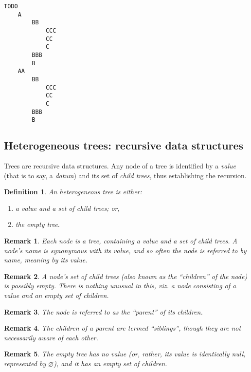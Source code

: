 \documentclass[10pt]{amsart}
\numberwithin{equation}{section}
\newtheorem{defn}{Definition}[section]
\newtheorem{remark}{Remark}[section]
\begin{document}
\begin{verbatim}
TODO
    A
        BB
            CCC
            CC
            C
        BBB
        B
    AA
        BB
            CCC
            CC
            C
        BBB
        B
\end{verbatim}

\newpage
\subsection{Heterogeneous trees: recursive data structures}
\label{sec:org8855709}
Trees are recursive data structures.  Any node of a tree is identified by
a \emph{value} (that is to say, a \emph{datum}) and its set of \emph{child trees}, thus establishing the recursion.

\begin{defn}
\label{defn:1}
An heterogeneous tree is either:
    \begin{enumerate}
        \item a value and a set of child trees; or,
        \item the empty tree.
    \end{enumerate}
\end{defn}

\begin{remark}
Each node is a tree, containing a value and a set of child trees.
A node's \emph{name\/} is synonymous with its value, and so
often the node is referred to by name, meaning by its value. 
\end{remark}

\begin{remark}
A node's set of child trees (also known as the ``children'' of the node)
is possibly empty. There is nothing unusual in this, \emph{viz.\/}
a node consisting of a value and an empty set of children.
\end{remark}

\begin{remark}
The node is referred to as the ``parent'' of its children.
\end{remark}

\begin{remark}
The children of a parent are termed ``siblings'', though
they are not necessarily aware of each other.
\end{remark}

\begin{remark}
The empty tree has no value (or, rather, its value is identically null, represented
by $\varnothing$), and it has an empty set of children.
\end{remark}
\end{document}
